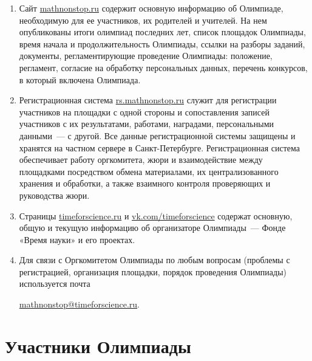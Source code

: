 \documentclass[a4paper,12pt]{article}
\newcommand{\surl}[1]{{\small\url{#1}}}
\begin{document}
\begin{enumerate}
	\item Сайт \surl{mathnonstop.ru} содержит основную информацию об Олимпиаде, необходимую для ее участников, их родителей и учителей. На нем опубликованы итоги олимпиад последних лет, список площадок Олимпиады, время начала и продолжительность Олимпиады, ссылки на разборы заданий, документы, регламентирующие проведение Олимпиады: положение, регламент, согласие на обработку персональных данных, перечень конкурсов, в который включена Олимпиада.
	\item Регистрационная система \surl{rs.mathnonstop.ru} служит для регистрации участников на площадки с одной стороны и сопоставления записей участников с их результатами, работами, наградами, персональными данными~— с другой. Все данные регистрационной системы защищены и хранятся на частном сервере в Санкт-Петербурге. Регистрационная система обеспечивает работу оргкомитета, жюри и взаимодействие между площадками посредством обмена материалами, их централизованного хранения и обработки, а также взаимного контроля проверяющих и руководства жюри.
	\item Страницы \surl{timeforscience.ru} и \surl{vk.com/timeforscience} содержат основную, общую и текущую информацию об организаторе Олимпиады~— Фонде «Время науки» и его проектах.
	\item Для связи с Оргкомитетом Олимпиады по любым вопросам (проблемы с регистрацией, организация площадки, порядок проведения Олимпиады) используется почта
	\begin{center} \surl{mathnonstop@timeforscience.ru}. \end{center}
\end{enumerate}

\section{Участники Олимпиады}
\end{document}
